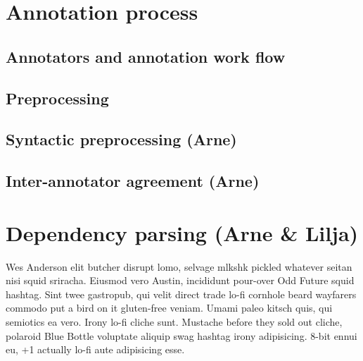 \documentclass[11pt,a4paper]{article}
\begin{document}
\section{Annotation process}
\subsection{Annotators and annotation work flow}
\subsection{Preprocessing}
\subsection{Syntactic preprocessing (Arne)}
\subsection{Inter-annotator agreement (Arne)}

\section{Dependency parsing (Arne \& Lilja)}
Wes Anderson elit butcher disrupt lomo, selvage mlkshk pickled whatever seitan
nisi squid sriracha. Eiusmod vero Austin, incididunt pour-over Odd Future
squid hashtag. Sint twee gastropub, qui velit direct trade lo-fi cornhole
beard wayfarers commodo put a bird on it gluten-free veniam. Umami paleo
kitsch quis, qui semiotics ea vero. Irony lo-fi cliche sunt. Mustache before
they sold out cliche, polaroid Blue Bottle voluptate aliquip swag hashtag
irony adipisicing. 8-bit ennui eu, +1 actually lo-fi aute adipisicing esse.

\clearpage

\end{document}
